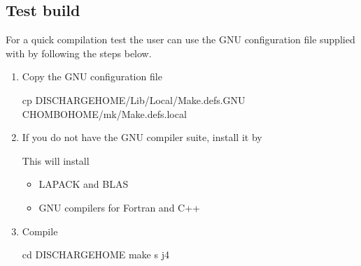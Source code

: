 \documentclass[letterpaper,10pt,english]{sphinxmanual}
\begin{document}
\subsection{Test build}
\label{\detokenize{Base/Installation:test-build}}
\sphinxAtStartPar
For a quick compilation test the user can use the GNU configuration file supplied with  by following the steps below.
\begin{enumerate}
%
\item {} 
\sphinxAtStartPar
Copy the GNU configuration file

\begin{sphinxVerbatim}[commandchars=\\\{\},formatcom=\scriptsize]
cp \PYGZdl{}DISCHARGE\PYGZus{}HOME/Lib/Local/Make.defs.GNU \PYGZdl{}CHOMBO\PYGZus{}HOME/mk/Make.defs.local
\end{sphinxVerbatim}

\item {} 
\sphinxAtStartPar
If you do not have the GNU compiler suite, install it by

\begin{sphinxVerbatim}[commandchars=\\\{\},formatcom=\scriptsize]
       
\end{sphinxVerbatim}

\sphinxAtStartPar
This will install
\begin{itemize}
\item {} 
\sphinxAtStartPar
LAPACK and BLAS

\item {} 
\sphinxAtStartPar
GNU compilers for Fortran and C++

\end{itemize}

\item {} 
\sphinxAtStartPar
Compile 

\begin{sphinxVerbatim}[commandchars=\\\{\},formatcom=\scriptsize]
cd \PYGZdl{}DISCHARGE\PYGZus{}HOME
make \PYGZhy{}s \PYGZhy{}j4
\end{sphinxVerbatim}

\end{enumerate}
\end{document}
